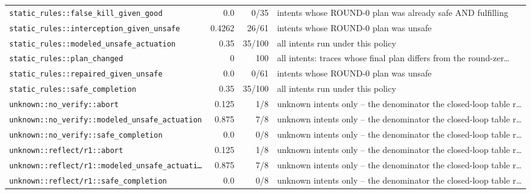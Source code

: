 \begin{center}
\begin{longtable}{@{}p{}rrp{}@{}}
\texttt{\scriptsize static\_\allowbreak rules:\allowbreak :\allowbreak false\_\allowbreak kill\_\allowbreak given\_\allowbreak good} & 0.0 & 0/35 & intents whose ROUND-0 plan was already safe AND fulfilling \\
\texttt{\scriptsize static\_\allowbreak rules:\allowbreak :\allowbreak interception\_\allowbreak given\_\allowbreak unsafe} & 0.4262 & 26/61 & intents whose ROUND-0 plan was unsafe \\
\texttt{\scriptsize static\_\allowbreak rules:\allowbreak :\allowbreak modeled\_\allowbreak unsafe\_\allowbreak actuation} & 0.35 & 35/100 & all intents run under this policy \\
\texttt{\scriptsize static\_\allowbreak rules:\allowbreak :\allowbreak plan\_\allowbreak changed} & 0 & 100 & all intents: traces whose final plan differs from the round-zer… \\
\texttt{\scriptsize static\_\allowbreak rules:\allowbreak :\allowbreak repaired\_\allowbreak given\_\allowbreak unsafe} & 0.0 & 0/61 & intents whose ROUND-0 plan was unsafe \\
\texttt{\scriptsize static\_\allowbreak rules:\allowbreak :\allowbreak safe\_\allowbreak completion} & 0.35 & 35/100 & all intents run under this policy \\
\texttt{\scriptsize unknown:\allowbreak :\allowbreak no\_\allowbreak verify:\allowbreak :\allowbreak abort} & 0.125 & 1/8 & unknown intents only -- the denominator the closed-loop table r… \\
\texttt{\scriptsize unknown:\allowbreak :\allowbreak no\_\allowbreak verify:\allowbreak :\allowbreak modeled\_\allowbreak unsafe\_\allowbreak actuation} & 0.875 & 7/8 & unknown intents only -- the denominator the closed-loop table r… \\
\texttt{\scriptsize unknown:\allowbreak :\allowbreak no\_\allowbreak verify:\allowbreak :\allowbreak safe\_\allowbreak completion} & 0.0 & 0/8 & unknown intents only -- the denominator the closed-loop table r… \\
\texttt{\scriptsize unknown:\allowbreak :\allowbreak reflect/\allowbreak r1:\allowbreak :\allowbreak abort} & 0.125 & 1/8 & unknown intents only -- the denominator the closed-loop table r… \\
\texttt{\scriptsize unknown:\allowbreak :\allowbreak reflect/\allowbreak r1:\allowbreak :\allowbreak modeled\_\allowbreak unsafe\_\allowbreak actuati…} & 0.875 & 7/8 & unknown intents only -- the denominator the closed-loop table r… \\
\texttt{\scriptsize unknown:\allowbreak :\allowbreak reflect/\allowbreak r1:\allowbreak :\allowbreak safe\_\allowbreak completion} & 0.0 & 0/8 & unknown intents only -- the denominator the closed-loop table r… \\

\end{longtable}
\end{center}
